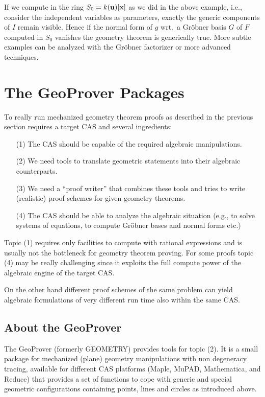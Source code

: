 \documentclass[11pt]{article}
\begin{document}
If we compute in the ring $S_0 = k({\bf u})[{\bf x}]$ as we did
in the above example, i.e., consider the independent variables as
parameters, exactly the generic components of $I$ remain visible.
Hence if the normal form of $g$ wrt.\ a Gr\"obner basis $G$ of
$F$ computed in $S_0$ vanishes the geometry theorem is
generically true.  More subtle examples can be analyzed with the
Gr\"obner factorizer or more advanced techniques.

\section{The GeoProver Packages}

To really run mechanized geometry theorem proofs as described in
the previous section requires a target CAS and several
ingredients:
\begin{itemize}\itemsep0pt
\item[(1)] The CAS should be capable of the required algebraic
manipulations.
\item[(2)] We need tools to translate geometric statements into
their algebraic counterparts.
\item[(3)] We need a ``proof writer'' that combines these tools
and tries to write (realistic) proof schemes for given geometry
theorems.
\item[(4)] The CAS should be able to analyze the algebraic
situation (e.g., to solve systems of equations, to compute
Gr\"obner bases and normal forms etc.)
\end{itemize}

Topic (1) requires only facilities to compute with rational
expressions and is usually not the bottleneck for geometry
theorem proving.  For some proofs topic (4) may be really
challenging since it exploits the full compute power of the
algebraic engine of the target CAS.

On the other hand different proof schemes of the same problem can
yield algebraic formulations of very different run time also
within the same CAS.

\subsection{About the GeoProver}

The GeoProver (formerly GEOMETRY) provides tools for topic (2).
It is a small package for mechanized (plane) geometry
manipulations with non degeneracy tracing, available for
different CAS platforms (Maple, MuPAD, Mathematica, and Reduce)
that provides a set of functions to cope with generic and special
geometric configurations containing points, lines and circles as
introduced above.
\end{document}
